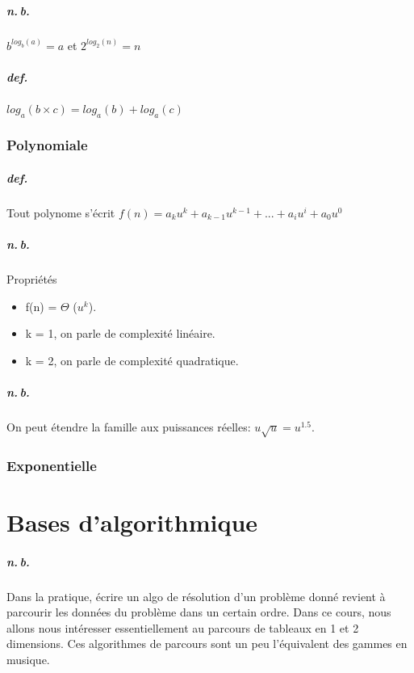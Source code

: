 \documentclass{report}
\begin{document}
      \paragraph{n.\,b.} $b^{log_{b}(a)} = a$ et $2^{log_{2}(n)} = n$

      \paragraph{def.} $log_{a}(b \times c) = log_{a}(b) + log_{a}(c)$

    \subsection{Polynomiale}

      \paragraph{def.} Tout polynome s'écrit $f(n) = a_{k}u^{k} + a_{k-1}u^{k-1} + ... + a_{i}u^{i} + a_{0}u^{0}$

      \paragraph{n.\,b.} Propriétés
      \begin{itemize}
        \item f(n) = $\Theta$ ($u^{k}$).
        \item k = 1, on parle de complexité linéaire.
        \item k = 2, on parle de complexité quadratique.
      \end{itemize}

      \paragraph{n.\,b.} On peut étendre la famille aux puissances réelles: $u\sqrt{u} = u^{1.5}$.

    \subsection{Exponentielle}

\chapter{Bases d'algorithmique}

  \setcounter{section}{0}
  \setcounter{algorithm}{0}

  \paragraph{n.\,b.} Dans la pratique, écrire un algo de résolution d'un problème donné revient à parcourir les données du problème dans un certain ordre. Dans ce cours, nous allons nous intéresser essentiellement au parcours de tableaux en 1 et 2 dimensions. Ces algorithmes de parcours sont un peu l'équivalent des gammes en musique.
\end{document}
